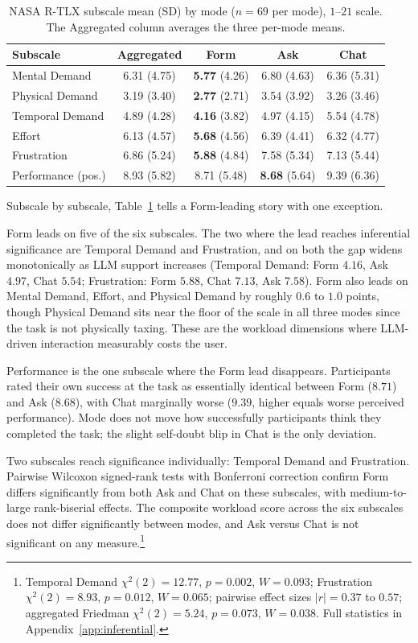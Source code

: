 \begin{table}[htbp]
\centering
\caption{NASA R-TLX subscale mean (SD) by mode ($n = 69$ per mode),
$1$--$21$ scale. The Aggregated column averages the three per-mode means.}
\label{tab:rtlx-per-subscale}
\begin{tabular}{@{}l c c c c@{}}
\toprule
Subscale & Aggregated & Form & Ask & Chat \\
\midrule
Mental Demand      & 6.31 (4.75) & \textbf{5.77} (4.26) & 6.80 (4.63) & 6.36 (5.31) \\
Physical Demand    & 3.19 (3.40) & \textbf{2.77} (2.71) & 3.54 (3.92) & 3.26 (3.46) \\
Temporal Demand    & 4.89 (4.28) & \textbf{4.16} (3.82) & 4.97 (4.15) & 5.54 (4.78) \\
Effort             & 6.13 (4.57) & \textbf{5.68} (4.56) & 6.39 (4.41) & 6.32 (4.77) \\
Frustration        & 6.86 (5.24) & \textbf{5.88} (4.84) & 7.58 (5.34) & 7.13 (5.44) \\
Performance (pos.) & 8.93 (5.82) & 8.71 (5.48) & \textbf{8.68} (5.64) & 9.39 (6.36) \\
\bottomrule
\end{tabular}
\end{table}

Subscale by subscale, Table~\ref{tab:rtlx-per-subscale} tells a
Form-leading story with one exception.

Form leads on five of the six subscales. The two where the lead
reaches inferential significance are Temporal Demand and
Frustration, and on both the gap widens monotonically as LLM
support increases (Temporal Demand: Form $4.16$, Ask $4.97$, Chat
$5.54$; Frustration: Form $5.88$, Chat $7.13$, Ask $7.58$). Form
also leads on Mental Demand, Effort, and Physical Demand by
roughly $0.6$ to $1.0$ points, though Physical Demand sits near
the floor of the scale in all three modes since the task is not
physically taxing. These are the workload dimensions where
LLM-driven interaction measurably costs the user.

Performance is the one subscale where the Form lead disappears.
Participants rated their own success at the task as essentially
identical between Form ($8.71$) and Ask ($8.68$), with Chat
marginally worse ($9.39$, higher equals worse perceived
performance). Mode does not move how successfully participants
think they completed the task; the slight self-doubt blip in Chat
is the only deviation.

Two subscales reach significance individually: Temporal
Demand and Frustration. Pairwise Wilcoxon signed-rank tests with
Bonferroni correction confirm Form differs significantly from
both Ask and Chat on these subscales, with medium-to-large
rank-biserial effects. The composite workload score across the
six subscales does not differ significantly between modes, and
Ask versus Chat is not significant on any
measure.\footnote{Temporal Demand $\chi^2(2) = 12.77$,
$p = 0.002$, $W = 0.093$; Frustration $\chi^2(2) = 8.93$,
$p = 0.012$, $W = 0.065$; pairwise effect sizes
$|r| = 0.37$ to $0.57$; aggregated Friedman
$\chi^2(2) = 5.24$, $p = 0.073$, $W = 0.038$. Full statistics in
Appendix~\ref{app:inferential}.}

